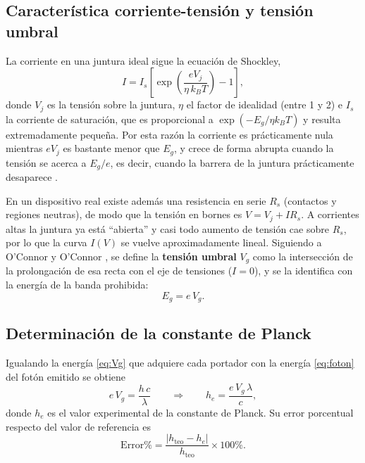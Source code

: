 \documentclass{article}
\begin{document}
\subsection{Característica corriente-tensión y tensión umbral}

La corriente en una juntura ideal sigue la ecuación de Shockley,
\begin{equation}
    I=I_s\left[\exp\left(\frac{eV_j}{\eta\,k_BT}\right)-1\right],
    \label{eq:shockley}
\end{equation}
donde $V_j$ es la tensión sobre la juntura, $\eta$ el factor de idealidad (entre 1 y 2) e $I_s$ la corriente de saturación, que es proporcional a $\exp(-E_g/\eta k_BT)$ y resulta extremadamente pequeña. Por esta razón la corriente es prácticamente nula mientras $eV_j$ es bastante menor que $E_g$, y crece de forma abrupta cuando la tensión se acerca a $E_g/e$, es decir, cuando la barrera de la juntura prácticamente desaparece \cite{sze}.

En un dispositivo real existe además una resistencia en serie $R_s$ (contactos y regiones neutras), de modo que la tensión en bornes es $V=V_j+IR_s$. A corrientes altas la juntura ya está ``abierta'' y casi todo aumento de tensión cae sobre $R_s$, por lo que la curva $I(V)$ se vuelve aproximadamente lineal. Siguiendo a O'Connor y O'Connor \cite{oconnor}, se define la \textbf{tensión umbral} $V_g$ como la intersección de la prolongación de esa recta con el eje de tensiones ($I=0$), y se la identifica con la energía de la banda prohibida:
\begin{equation}
    E_g=e\,V_g.
    \label{eq:Vg}
\end{equation}

\subsection{Determinación de la constante de Planck}

Igualando la energía \eqref{eq:Vg} que adquiere cada portador con la energía \eqref{eq:foton} del fotón emitido se obtiene
\begin{equation}
    e\,V_g=\frac{h\,c}{\lambda}
    \qquad\Longrightarrow\qquad
    h_e=\frac{e\,V_g\,\lambda}{c},
    \label{eq:he}
\end{equation}
donde $h_e$ es el valor experimental de la constante de Planck. Su error porcentual respecto del valor de referencia es
\begin{equation}
    \mathrm{Error}\%=\frac{\left|h_{\mathrm{teo}}-h_e\right|}{h_{\mathrm{teo}}}\times100\%.
    \label{eq:error}
\end{equation}
\end{document}
